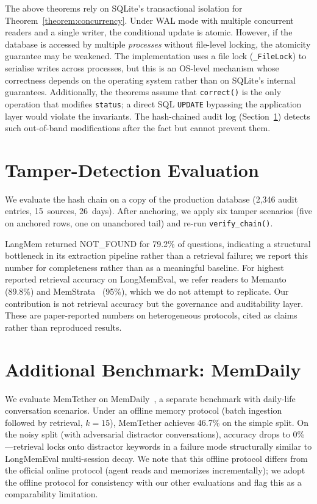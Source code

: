 \documentclass{article}
\begin{document}
The above theorems rely on SQLite's transactional isolation for Theorem~\ref{theorem:concurrency}. Under WAL mode with multiple concurrent readers and a single writer, the conditional update is atomic. However, if the database is accessed by multiple \emph{processes} without file-level locking, the atomicity guarantee may be weakened. The implementation uses a file lock (\texttt{\_FileLock}) to serialise writes across processes, but this is an OS-level mechanism whose correctness depends on the operating system rather than on SQLite's internal guarantees. Additionally, the theorems assume that \texttt{correct()} is the only operation that modifies \texttt{status}; a direct SQL \texttt{UPDATE} bypassing the application layer would violate the invariants. The hash-chained audit log (Section~\ref{sec:tamper}) detects such out-of-band modifications after the fact but cannot prevent them.


\section{Tamper-Detection Evaluation}
\label{sec:tamper}

We evaluate the hash chain on a copy of the production database (2{,}346 audit entries, 15~sources, 26~days). After anchoring, we apply six tamper scenarios (five on anchored rows, one on unanchored tail) and re-run \texttt{verify\_chain()}.



LangMem returned NOT\_FOUND for 79.2\% of questions, indicating a structural bottleneck in its extraction pipeline rather than a retrieval failure; we report this number for completeness rather than as a meaningful baseline. For highest reported retrieval accuracy on LongMemEval, we refer readers to Memanto~\citep{memanto} (89.8\%) and MemStrata~\citep{memstrata} (95\%), which we do not attempt to replicate. Our contribution is not retrieval accuracy but the governance and auditability layer. These are paper-reported numbers on heterogeneous protocols, cited as claims rather than reproduced results.

\section{Additional Benchmark: MemDaily}
\label{sec:memdaily}

We evaluate MemTether on MemDaily~\citep{memdaily}, a separate benchmark with daily-life conversation scenarios. Under an offline memory protocol (batch ingestion followed by retrieval, $k{=}15$), MemTether achieves 46.7\% on the simple split. On the noisy split (with adversarial distractor conversations), accuracy drops to 0\%---retrieval locks onto distractor keywords in a failure mode structurally similar to LongMemEval multi-session decay. We note that this offline protocol differs from the official online protocol (agent reads and memorizes incrementally); we adopt the offline protocol for consistency with our other evaluations and flag this as a comparability limitation.
\end{document}
